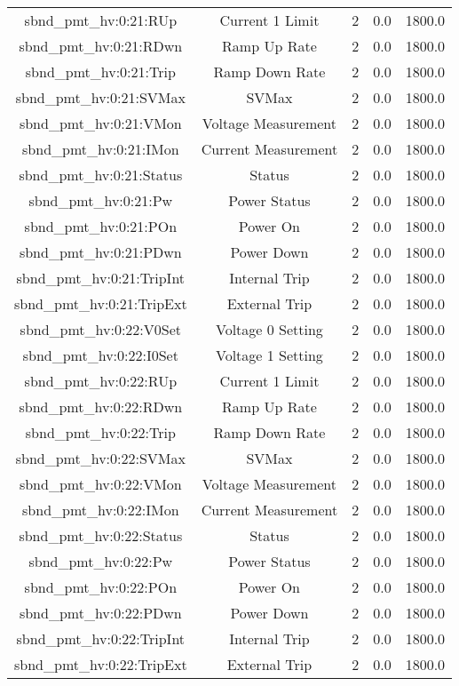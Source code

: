 \begin{center}
\begin{longtable}{c | c c c c }
sbnd\_pmt\_hv:0:21:RUp & Current 1 Limit & 2 & 0.0 & 1800.0\\ 
sbnd\_pmt\_hv:0:21:RDwn & Ramp Up Rate & 2 & 0.0 & 1800.0\\ 
sbnd\_pmt\_hv:0:21:Trip & Ramp Down Rate & 2 & 0.0 & 1800.0\\ 
sbnd\_pmt\_hv:0:21:SVMax & SVMax & 2 & 0.0 & 1800.0\\ 
sbnd\_pmt\_hv:0:21:VMon & Voltage Measurement & 2 & 0.0 & 1800.0\\ 
sbnd\_pmt\_hv:0:21:IMon & Current Measurement & 2 & 0.0 & 1800.0\\ 
sbnd\_pmt\_hv:0:21:Status & Status & 2 & 0.0 & 1800.0\\ 
sbnd\_pmt\_hv:0:21:Pw & Power Status & 2 & 0.0 & 1800.0\\ 
sbnd\_pmt\_hv:0:21:POn & Power On & 2 & 0.0 & 1800.0\\ 
sbnd\_pmt\_hv:0:21:PDwn & Power Down & 2 & 0.0 & 1800.0\\ 
sbnd\_pmt\_hv:0:21:TripInt & Internal Trip & 2 & 0.0 & 1800.0\\ 
sbnd\_pmt\_hv:0:21:TripExt & External Trip & 2 & 0.0 & 1800.0\\ 
sbnd\_pmt\_hv:0:22:V0Set & Voltage 0 Setting & 2 & 0.0 & 1800.0\\ 
sbnd\_pmt\_hv:0:22:I0Set & Voltage 1 Setting & 2 & 0.0 & 1800.0\\ 
sbnd\_pmt\_hv:0:22:RUp & Current 1 Limit & 2 & 0.0 & 1800.0\\ 
sbnd\_pmt\_hv:0:22:RDwn & Ramp Up Rate & 2 & 0.0 & 1800.0\\ 
sbnd\_pmt\_hv:0:22:Trip & Ramp Down Rate & 2 & 0.0 & 1800.0\\ 
sbnd\_pmt\_hv:0:22:SVMax & SVMax & 2 & 0.0 & 1800.0\\ 
sbnd\_pmt\_hv:0:22:VMon & Voltage Measurement & 2 & 0.0 & 1800.0\\ 
sbnd\_pmt\_hv:0:22:IMon & Current Measurement & 2 & 0.0 & 1800.0\\ 
sbnd\_pmt\_hv:0:22:Status & Status & 2 & 0.0 & 1800.0\\ 
sbnd\_pmt\_hv:0:22:Pw & Power Status & 2 & 0.0 & 1800.0\\ 
sbnd\_pmt\_hv:0:22:POn & Power On & 2 & 0.0 & 1800.0\\ 
sbnd\_pmt\_hv:0:22:PDwn & Power Down & 2 & 0.0 & 1800.0\\ 
sbnd\_pmt\_hv:0:22:TripInt & Internal Trip & 2 & 0.0 & 1800.0\\ 
sbnd\_pmt\_hv:0:22:TripExt & External Trip & 2 & 0.0 & 1800.0\\ 

\end{longtable}
\end{center}
